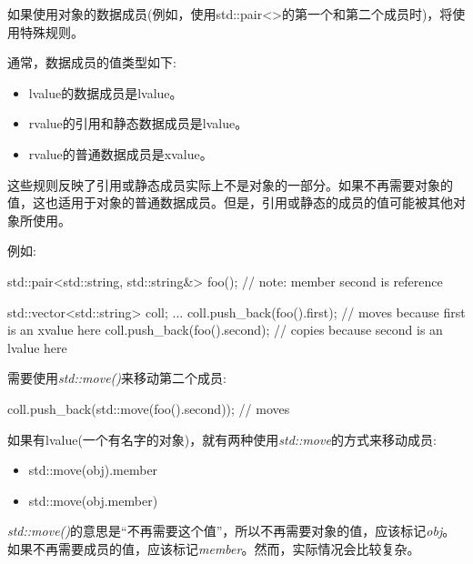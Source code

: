 
如果使用对象的数据成员(例如，使用std::pair<>的第一个和第二个成员时)，将使用特殊规则。\par

通常，数据成员的值类型如下:\par

\begin{itemize}
  \item lvalue的数据成员是lvalue。
  \item rvalue的引用和静态数据成员是lvalue。
  \item rvalue的普通数据成员是xvalue。
\end{itemize}

这些规则反映了引用或静态成员实际上不是对象的一部分。如果不再需要对象的值，这也适用于对象的普通数据成员。但是，引用或静态的成员的值可能被其他对象所使用。\par

例如:\par

\begin{codebox}[cpp]
std::pair<std::string, std::string&> foo(); // note: member second is reference

std::vector<std::string> coll;
...
coll.push_back(foo().first); // moves because first is an xvalue here
coll.push_back(foo().second); // copies because second is an lvalue here
\end{codebox}

需要使用\textit{std::move()}来移动第二个成员:\par

\begin{codebox}[cpp]
coll.push_back(std::move(foo().second)); // moves
\end{codebox}

如果有lvalue(一个有名字的对象)，就有两种使用\textit{std::move}的方式来移动成员:\par

\begin{itemize}
  \item std::move(obj).member
  \item std::move(obj.member)
\end{itemize}

\textit{std::move()}的意思是“不再需要这个值”，所以不再需要对象的值，应该标记\textit{obj}。如果不再需要成员的值，应该标记\textit{member}。然而，实际情况会比较复杂。\par


